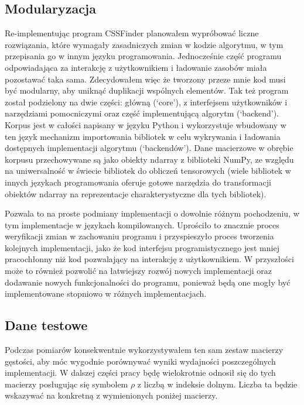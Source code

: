 \documentclass[11pt, a4paper]{article}
\begin{document}
\begin{sloppypar}
    \subsection{Modularyzacja}
    Re-implementując program CSSFinder planowałem wypróbować liczne rozwiązania, które
    wymagały zasadniczych zmian w kodzie algorytmu, w tym przepisania go w innym języku programowania.
    Jednocześnie część programu odpowiadająca za interakcję z użytkownikiem i ładowanie
    zasobów miała pozostawać taka sama. Zdecydowałem więc że tworzony przeze mnie kod musi
    być modularny, aby uniknąć duplikacji wspólnych elementów. Tak też program został podzielony
    na dwie części: główną (`core'), z interfejsem użytkowników i narzędziami pomocniczymi
    oraz część implementującą algorytm (`backend'). Korpus jest w całości napisany w
    języku Python i wykorzystuje wbudowany w ten język mechanizm importowania bibliotek
    w celu wykrywania i ładowania dostępnych implementacji algorytmu (`backendów'). Dane
    macierzowe w obrębie korpusu przechowywane są jako obiekty ndarray z biblioteki NumPy,
    ze względu na uniwersalność w świecie bibliotek do obliczeń tensorowych (wiele bibliotek
    w innych językach programowania oferuje gotowe narzędzia do transformacji obiektów ndarray
    na reprezentacje charakterystyczne dla tych bibliotek).

    Pozwala to na proste podmiany implementacji o dowolnie różnym pochodzeniu, w tym implementacje
    w językach kompilowanych. Uprościło to znacznie proces weryfikacji zmian w
    zachowaniu programu i przyspieszyło proces tworzenia kolejnych implementacji, jako że
    kod interfejsu programistycznego jest mniej pracochłonny niż kod pozwalający na interakcję
    z użytkownikiem. W przyszłości może to również pozwolić na łatwiejszy rozwój nowych
    implementacji oraz dodawanie nowych funkcjonalności do programu, ponieważ będą one mogły
    być implementowane stopniowo w różnych implementacjach.

    \subsection{Dane testowe}
    Podczas pomiarów konsekwentnie wykorzystywałem ten sam zestaw macierzy gęstości, aby
    móc wygodnie porównywać wyniki wydajności poszczególnych implementacji. W dalszej części
    pracy będę wielokrotnie odnosił się do tych macierzy posługując się symbolem $\rho$ z
    liczbą w indeksie dolnym. Liczba ta będzie wskazywać na konkretną z wymienionych
    poniżej macierzy.


\end{sloppypar}
\end{document}
